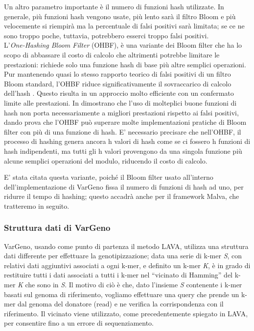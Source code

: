 \documentclass[../main.tex]{subfiles}
\begin{document}
Un altro parametro importante è il numero di funzioni hash utilizzate. In generale, più funzioni hash vengono usate, più lento sarà il filtro Bloom e più velocemente si riempirà ma la percentuale di falsi positivi sarà limitata; se ce ne sono troppo poche, tuttavia, potrebbero esserci troppo falsi positivi.\\

\noindent
L'\textit{One-Hashing Bloom Filter} (OHBF), è una variante dei Bloom filter che ha lo scopo di abbassare il costo di calcolo che altrimenti potrebbe limitare le prestazioni: richiede solo una funzione hash di base più altre semplici operazioni. Pur mantenendo quasi lo stesso rapporto teorico di falsi positivi di un filtro Bloom standard, l'OHBF riduce significativamente il sovraccarico di calcolo dell'hash \cite{bloomonehash}. Questo risulta in un approccio molto efficiente con un confermato limite alle prestazioni. In \cite{bloomonehash} dimostrano che l'uso di molteplici buone funzioni di hash non porta necessariamente a migliori prestazioni rispetto ai falsi positivi, dando prova che l'OHBF può superare molte implementazioni pratiche di Bloom filter con più di una funzione di hash. E' necessario precisare che nell'OHBF, il processo di hashing genera ancora h valori di hash come se ci fossero h funzioni di hash indipendenti, ma tutti gli h valori provengono da una singola funzione più alcune semplici operazioni del modulo, riducendo il costo di calcolo. 

E' stata citata questa variante, poiché il Bloom filter usato all'interno dell'implementazione di VarGeno fissa il numero di funzioni di hash ad uno, per ridurre il tempo di hashing; questo accadrà anche per il framework Malva, che tratteremo in seguito.


\subsubsection{Struttura dati di VarGeno}
VarGeno, usando come punto di partenza il metodo LAVA, utilizza una struttura dati differente per effettuare la genotipizzazione; data una serie di k-mer \textit{S}, con relativi dati aggiuntivi associati a ogni k-mer, e definito un k-mer \textit{K}, è in grado di restituire tutti i dati associati a tutti i k-mer nel “vicinato di Hamming” del k-mer \textit{K} che sono in \textit{S}. Il motivo di ciò è che, dato l'insieme \textit{S} contenente i k-mer basati sul genoma di riferimento, vogliamo effettuare una query che prende un k-mer dal genoma del donatore (read) e ne verifica la corrispondenza con il riferimento. Il vicinato viene utilizzato, come precedentemente spiegato in LAVA, per consentire fino a un errore di sequenziamento. 
\end{document}
